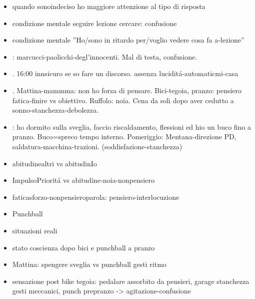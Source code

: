 \begin{itemize}
\item quando sonoindeciso ho maggiore attenzione al tipo di risposta

\item condizione mentale seguire lezione cercare: confusione

\item condizione mentale ''Ho/sono in ritardo per/voglio vedere cosa fa a-lezione''

\item {}: marcucci-paolicchi-degl'innocenti. Mal di testa, confusione.

\item {}. 16:00 innsicuro se so fare un discorso. assenza lucidit\'a-automaticmi-casa

\item {}. Mattina-mammma: non ho forza di pensare. Bici-tegoia, pranzo: pensiero fatica-finire vs obiettivo. Ruffolo: noia. Cena da soli dopo aver cedutto a sonno-stanchezza-debolezza.

\item {}: ho dormito sulla sveglia, faccio riscaldamento, flessioni ed hio un buco fino a pranzo. Buco=spreco tempo interno. Pomeriggio: Mentana-direzione PD, saldatura-macchina-trazioni. (soddisfazione-stanchezza)

\item abitudinealtri vs abitudinIo

\item ImpulsoPriorit\'a vs abitudine-noia-nonpensiero

\item faticasforzo-nonpensieroparola: pensiero-interlocuzione

\item Punchball

\item situazioni reali

\item stato coscienza dopo bici e punchball a pranzo

\item Mattina: spengere sveglia vs punchball gesti ritmo

\item sensazione post bike tegoia: pedalare assorbito da pensieri, garage stanchezza gesti meccanici, punch prepranzo -> agitazione-confusione


\end{itemize}
